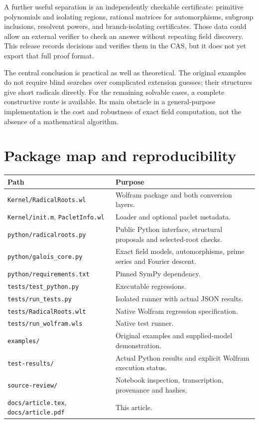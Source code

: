\documentclass[11pt,letterpaper]{article}
\newcommand{\code}[1]{\texttt{#1}}
\theoremstyle{definition}\newtheorem{definition}[theorem]{Definition}
\theoremstyle{remark}\newtheorem{remark}[theorem]{Remark}
\begin{document}
A further useful separation is an independently checkable certificate:
primitive polynomials and isolating regions, rational matrices for
automorphisms, subgroup inclusions, resolvent powers, and branch-isolating
certificates. Those data could allow an external verifier to check an answer
without repeating field discovery. This release records decisions and
verifies them in the CAS, but it does not yet export that full proof format.

The central conclusion is practical as well as theoretical. The original
examples do not require blind searches over complicated extension guesses;
their structures give short radicals directly. For the remaining solvable
cases, a complete constructive route is available. Its main obstacle in a
general-purpose implementation is the cost and robustness of exact field
computation, not the absence of a mathematical algorithm.

\appendix
\section{Package map and reproducibility}

\begin{longtable}{@{}p{}p{}@{}}
\toprule Path & Purpose \\ \midrule\endhead
\code{Kernel/RadicalRoots.wl} & Wolfram package and both conversion layers. \\
\code{Kernel/init.m}, \code{PacletInfo.wl} & Loader and optional paclet metadata. \\
\code{python/radicalroots.py} & Public Python interface, structural proposals and selected-root checks. \\
\code{python/galois\_core.py} & Exact field models, automorphisms, prime series and Fourier descent. \\
\code{python/requirements.txt} & Pinned SymPy dependency. \\
\code{tests/test\_python.py} & Executable regressions. \\
\code{tests/run\_tests.py} & Isolated runner with actual JSON results. \\
\code{tests/RadicalRoots.wlt} & Native Wolfram regression specification. \\
\code{tests/run\_wolfram.wls} & Native test runner. \\
\code{examples/} & Original examples and supplied-model demonstration. \\
\code{test-results/} & Actual Python results and explicit Wolfram execution status. \\
\code{source-review/} & Notebook inspection, transcription, provenance and hashes. \\
\code{docs/article.tex}, \code{docs/article.pdf} & This article. \\
\bottomrule
\end{longtable}
\end{document}
